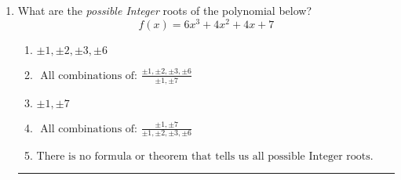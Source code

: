 \documentclass[14pt]{extbook}
\newcommand{\litem}[1]{\item#1\hspace*{-1cm}\rule{\textwidth}{0.4pt}}
\begin{document}
\begin{enumerate}
{\begin{enumerate}[label=\Alph*.]
\end{enumerate} }
\litem{
What are the \textit{possible Integer} roots of the polynomial below?\[ f(x) = 6x^{3} +4 x^{2} +4 x + 7 \]\begin{enumerate}[label=\Alph*.]
\item \( \pm 1,\pm 2,\pm 3,\pm 6 \)
\item \( \text{ All combinations of: }\frac{\pm 1,\pm 2,\pm 3,\pm 6}{\pm 1,\pm 7} \)
\item \( \pm 1,\pm 7 \)
\item \( \text{ All combinations of: }\frac{\pm 1,\pm 7}{\pm 1,\pm 2,\pm 3,\pm 6} \)
\item \( \text{There is no formula or theorem that tells us all possible Integer roots.} \)

\end{enumerate} }
\end{enumerate}
\end{document}
